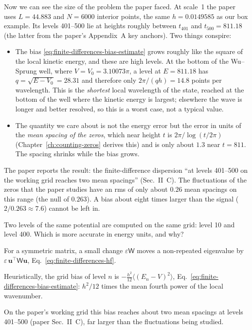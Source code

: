 Now we can see the size of the problem the paper faced. At scale~1 the paper uses $L=44.883$ and $N=6000$ interior points, the same $h=0.0149585$ as our box example. Its levels 401--500 lie at heights roughly between $t_{401}$ and $t_{500}=811.18$ (the latter from the paper's Appendix~A key anchors). Two things conspire:
\begin{itemize}
\item The bias \eqref{eq:finite-differences-bias-estimate} grows roughly like the square of the local kinetic energy, and these are high levels. At the bottom of the Wu--Sprung well, where $V=V_0=3.10073\pi$, a level at $E=811.18$ has $q=\sqrt{E-V_0}=28.31$ and therefore only $2\pi/(qh)=14.8$ points per wavelength. This is the \emph{shortest} local wavelength of the state, reached at the bottom of the well where the kinetic energy is largest; elsewhere the wave is longer and better resolved, so this is a worst case, not a typical value.
\item The quantity we care about is not the energy error but the error in units of the \emph{mean spacing of the zeros}, which near height $t$ is $2\pi/\log(t/2\pi)$ (Chapter~\ref{ch:counting-zeros} derives this) and is only about $1.3$ near $t=811$. The spacing shrinks while the bias grows.
\end{itemize}
The paper reports the result: the finite-difference dispersion ``at levels 401--500 on the working grid reaches two mean spacings'' (Sec.~II~C). The fluctuations of the zeros that the paper studies have an rms of only about $0.26$ mean spacings on this range (the null of $0.263$). A bias about eight times larger than the signal ($2/0.263\approx7.6$) cannot be left in.

\begin{checkpoint}
Two levels of the same potential are computed on the same grid: level 10 and level 400. Which is more accurate in energy units, and why?
\end{checkpoint}

\begin{keyideas}
\item For a symmetric matrix, a small change $\varepsilon\mathsf W$ moves a non-repeated eigenvalue by $\varepsilon\,\mathbf u^\top\mathsf W\mathbf u$, Eq.~\eqref{eq:finite-differences-hf}.
\item Heuristically, the grid bias of level $n$ is $-\tfrac{h^2}{12}\langle(E_n-V)^2\rangle$, Eq.~\eqref{eq:finite-differences-bias-estimate}: $h^2/12$ times the mean fourth power of the local wavenumber.
\item On the paper's working grid this bias reaches about two mean spacings at levels 401--500 (paper Sec.~II~C), far larger than the fluctuations being studied.
\end{keyideas}

